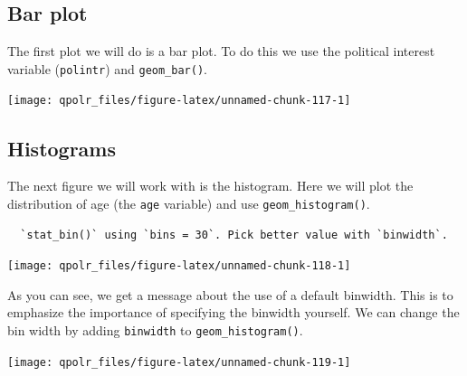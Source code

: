 \documentclass[12pt,oneside]{reedthesis}
\theoremstyle{definition}
\theoremstyle{definition}
\theoremstyle{definition}
\theoremstyle{remark}
\begin{document}
  \subsection{Bar plot}\label{bar-plot}
  
  The first plot we will do is a bar plot. To do this we use the political
  interest variable (\texttt{polintr}) and \texttt{geom\_bar()}.
  \begin{Shaded}
  \begin{Highlighting}[]
  \NormalTok{(}\OperatorTok{+}
  \StringTok{  }\NormalTok{() }
  \end{Highlighting}
  \end{Shaded}
  \begin{center}\texttt{[image: qpolr\_files/figure-latex/unnamed-chunk-117-1]} \end{center}
  
  \subsection{Histograms}\label{histograms}
  
  The next figure we will work with is the histogram. Here we will plot
  the distribution of age (the \texttt{age} variable) and use
  \texttt{geom\_histogram()}.
  \begin{Shaded}
  \begin{Highlighting}[]
  \NormalTok{(}\OperatorTok{+}
  \StringTok{  }\NormalTok{() }
  \end{Highlighting}
  \end{Shaded}
  \begin{verbatim}
  `stat_bin()` using `bins = 30`. Pick better value with `binwidth`.
  \end{verbatim}
  \begin{center}\texttt{[image: qpolr\_files/figure-latex/unnamed-chunk-118-1]} \end{center}
  
  As you can see, we get a message about the use of a default binwidth.
  This is to emphasize the importance of specifying the binwidth yourself.
  We can change the bin width by adding \texttt{binwidth} to
  \texttt{geom\_histogram()}.
  \begin{Shaded}
  \begin{Highlighting}[]
  \NormalTok{(}\OperatorTok{+}
  \StringTok{  }\NormalTok{(} \NormalTok{)}
  \end{Highlighting}
  \end{Shaded}
  \begin{center}\texttt{[image: qpolr\_files/figure-latex/unnamed-chunk-119-1]} \end{center}
  
\end{document}
